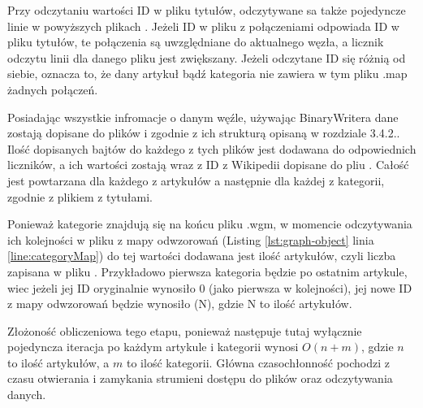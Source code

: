 Przy odczytaniu wartości ID w pliku tytułów, odczytywane sa także pojedyncze linie w powyższych plikach . Jeżeli ID w pliku z połączeniami odpowiada ID w pliku tytułów, te połączenia są uwzględniane do aktualnego węzła, a licznik odczytu linii dla danego pliku jest zwiększany. Jeżeli odczytane ID się różnią od siebie, oznacza to, że dany artykuł bądź kategoria nie zawiera w tym pliku .map żadnych połączeń.

Posiadając wszystkie infromacje o danym węźle, używając BinaryWritera dane zostają dopisane do plików  i  zgodnie z ich strukturą opisaną w rozdziale 3.4.2.. Ilość dopisanych bajtów do każdego z tych plików jest dodawana do odpowiednich liczników, a ich wartości zostają wraz z ID z Wikipedii dopisane do pliu . Całość jest powtarzana dla każdego z artykułów a następnie dla każdej z kategorii, zgodnie z plikiem z tytułami.

Ponieważ kategorie znajdują się na końcu pliku .wgm, w momencie odczytywania ich kolejności w pliku  z mapy odwzorowań (Listing \ref{lst:graph-object} linia \ref{line:categoryMap}) do tej wartości dodawana jest ilość artykułów, czyli liczba zapisana w pliku . Przykładowo pierwsza kategoria będzie po ostatnim artykule, wiec jeżeli jej ID oryginalnie wynosiło 0 (jako pierwsza w kolejności), jej nowe ID z mapy odwzorowań będzie wynosiło (N), gdzie N to ilość artykułów.

Złożoność obliczeniowa tego etapu, ponieważ następuje tutaj wyłącznie pojedyncza iteracja po każdym artykule i kategorii wynosi $O(n+m)$, gdzie $n$ to ilość artykułów, a $m$ to ilość kategorii. Główna czasochłonność pochodzi z czasu otwierania i zamykania strumieni dostępu do plików oraz odczytywania danych.
